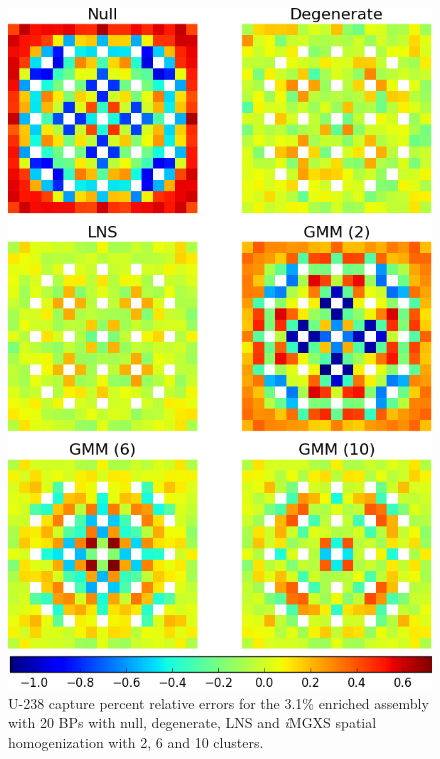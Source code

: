 \begin{figure}[h!]
\centering
\includegraphics[width=0.9\linewidth]{figures/results/spatial/assm-31-20BPs/capt-err}
\vspace{2mm}
\caption[U-238 capture errors for the 3.1\% enriched assembly with 20 BPs]{U-238 capture percent relative errors for the 3.1\% enriched assembly with 20 \acp{BP} with null, degenerate, \ac{LNS} and \textit{i}\ac{MGXS} spatial homogenization with 2, 6 and 10 clusters.}
\label{fig:chap11-assm-3.1-20BPs-capt-err}
\end{figure}

\clearpage

